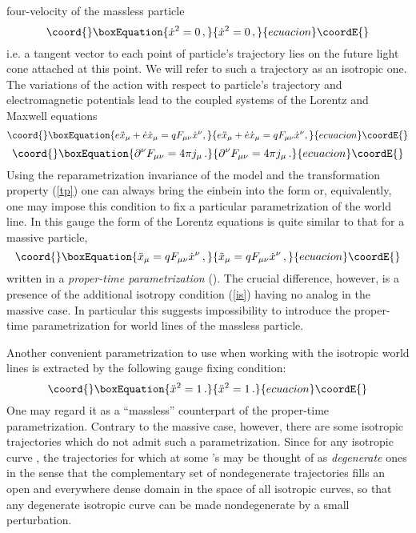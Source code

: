 \documentclass[a4paper,12pt]{article}
\begin{document}
four-velocity of the massless particle
\begin{equation}\coord{}\boxEquation{\label{is}
\dot{x}^2=0\,,
}{\dot{x}^2=0\,,
}{ecuacion}\coordE{}\end{equation}
i.e. a tangent vector to each point of particle's trajectory
\coordHE{} lies on the future light cone attached at this
point. We will refer to such a trajectory as an isotropic one. The
variations of the action with respect to particle's trajectory
\coordHE{} and electromagnetic potentials \coordHE{} lead to
the coupled systems of the Lorentz and Maxwell equations
\begin{equation}\coord{}\boxEquation{ \label{leq}
e\ddot{x}_\mu+\dot{e}\dot{x}_\mu=qF_{\mu\nu}\dot{x}^{\nu},
}{ e\ddot{x}_\mu+\dot{e}\dot{x}_\mu=qF_{\mu\nu}\dot{x}^{\nu},
}{ecuacion}\coordE{}\end{equation}
\begin{equation}\coord{}\boxEquation{ \label{meq}
\partial^{\nu}F_{\mu\nu}=4\pi{}j_{\mu}\,.
}{ \partial^{\nu}F_{\mu\nu}=4\pi{}j_{\mu}\,.
}{ecuacion}\coordE{}\end{equation}
Using the reparametrization invariance of the model and the
transformation property (\ref{tp}) one can always bring the
einbein \coordHE{} into the form \coordHE{} or, equivalently, one may impose
this condition to fix a particular parametrization of the world
line. In this gauge the form of the Lorentz equations is quite
similar to that for a  massive particle,
\begin{equation}\coord{}\boxEquation{ \label{feqm}
\ddot{x}_\mu=qF_{\mu\nu}\dot{x}^{\nu}\,,
}{ \ddot{x}_\mu=qF_{\mu\nu}\dot{x}^{\nu}\,,
}{ecuacion}\coordE{}\end{equation}
written in a \textit{proper-time parametrization} (\coordHE{}).
The crucial difference, however, is a presence of the additional
isotropy condition (\ref{is}) having no analog in the massive
case. In particular this suggests impossibility to introduce the
proper-time parametrization for world lines of the massless
particle.

Another convenient  parametrization to use when working with the
isotropic world lines is extracted by the following gauge fixing
condition:
\begin{equation}\coord{}\boxEquation{\label{gfc}
\ddot{x}^2=1\,.
}{\ddot{x}^2=1\,.
}{ecuacion}\coordE{}\end{equation}
One may regard it as a ``massless'' counterpart of the
proper-time parametrization. Contrary to the massive case,
however, there are some isotropic trajectories which do not admit
such a parametrization. Since for any isotropic curve
\coordHE{}, the trajectories for which \coordHE{} at
some  \myHighlight{$\tau$}\coordHE{}'s may be thought of as \textit{degenerate} ones in
the sense that the complementary set of nondegenerate trajectories
fills an open and everywhere dense domain in the space of all
isotropic curves, so that any degenerate isotropic curve can be
made nondegenerate by a small perturbation.
\end{document}
